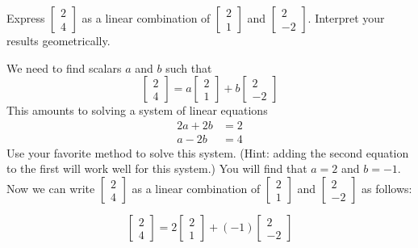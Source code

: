 \documentclass{ximera}
\begin{document}
\begin{example}\label{ex:lincombgeometry1}
Express $\begin{bmatrix}2\\4\end{bmatrix}$ as a linear combination of $\begin{bmatrix}2\\1\end{bmatrix}$ and $\begin{bmatrix}2\\-2\end{bmatrix}$.  Interpret your results geometrically.
\begin{explanation}
We need to find scalars $a$ and $b$ such that 
$$\begin{bmatrix}2\\4\end{bmatrix}=a\begin{bmatrix}2\\1\end{bmatrix}+b\begin{bmatrix}2\\-2\end{bmatrix}$$
This amounts to solving a system of linear equations
\begin{align*}
2a+2b&=2\\
a-2b&=4
\end{align*}
Use your favorite method to solve this system. (Hint: adding the second equation to the first will work well for this system.) You will find that $a=2$ and $b=-1$.  Now we can write $\begin{bmatrix}2\\4\end{bmatrix}$ as a linear combination of $\begin{bmatrix}2\\1\end{bmatrix}$ and $\begin{bmatrix}2\\-2\end{bmatrix}$ as follows:

$$\begin{bmatrix}2\\4\end{bmatrix}=2\begin{bmatrix}2\\1\end{bmatrix}+(-1)\begin{bmatrix}2\\-2\end{bmatrix}$$


\end{explanation}
\end{example}
\end{document}
